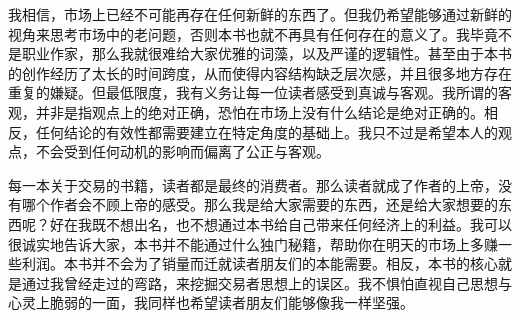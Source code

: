 我相信，市场上已经不可能再存在任何新鲜的东西了。但我仍希望能够通过新鲜的视角来思考市场中的老问题，否则本书也就不再具有任何存在的意义了。我毕竟不是职业作家，那么我就很难给大家优雅的词藻，以及严谨的逻辑性。甚至由于本书的创作经历了太长的时间跨度，从而使得内容结构缺乏层次感，并且很多地方存在重复的嫌疑。但最低限度，我有义务让每一位读者感受到真诚与客观。我所谓的客观，并非是指观点上的绝对正确，恐怕在市场上没有什么结论是绝对正确的。相反，任何结论的有效性都需要建立在特定角度的基础上。我只不过是希望本人的观点，不会受到任何动机的影响而偏离了公正与客观。

每一本关于交易的书籍，读者都是最终的消费者。那么读者就成了作者的上帝，没有哪个作者会不顾上帝的感受。那么我是给大家需要的东西，还是给大家想要的东西呢？好在我既不想出名，也不想通过本书给自己带来任何经济上的利益。我可以很诚实地告诉大家，本书并不能通过什么独门秘籍，帮助你在明天的市场上多赚一些利润。本书并不会为了销量而迁就读者朋友们的本能需要。相反，本书的核心就是通过我曾经走过的弯路，来挖掘交易者思想上的误区。我不惧怕直视自己思想与心灵上脆弱的一面，我同样也希望读者朋友们能够像我一样坚强。
